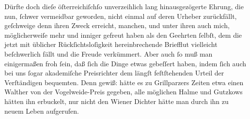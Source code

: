 \pstart
           Dürfte doch dieſe öſterreichiſchſo unverzeihlich lang hinausgezögerte Ehrung, die
               nun,{ }ſchwer vermeidbar geworden, nicht einmal auf deren Urheber zurückfällt,
               geſchweige denn ihren Zweck erreicht, manchen, und unter ihren auch mich,
               möglicherweiſe mehr und inniger gefreut haben als den Geehrten{ }ſelbſt, dem die jetzt
               mit üblicher Rückſichtsloſigkeit hereinbrechende Briefflut vielleicht beſchwerlich
               fällt {\pb}und die Freude verkümmert. Aber
               auch{ }ſo muß man einigermaßen froh{ }ſein, daß{ }ſich die Dinge etwas gebeſſert haben,
               indem{ }ſich auch bei uns{ }ſogar akademiſche Preisrichter dem längſt feſtſtehenden
               Urteil der Verſtändigen bequemten. Denn gewiß: hätte es zu Grillparzers Zeiten etwa einen Walther von der Vogelweide-Preis gegeben, alle möglichen Halme und Gutzkows
               hätten ihn erbuckelt, nur nicht den Wiener Dichter hätte man durch ihn
               zu neuem Leben aufgerufen.\pend
           
